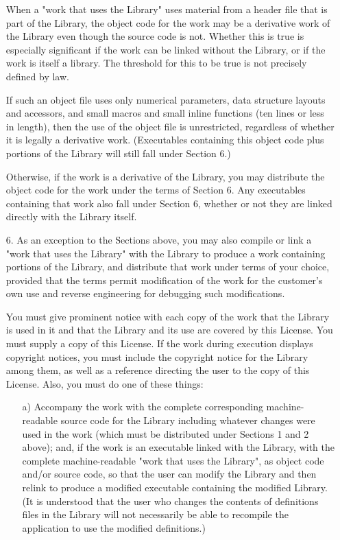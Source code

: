 \begin{itemize}
  When a "work that uses the Library" uses material from a header file
that is part of the Library, the object code for the work may be a
derivative work of the Library even though the source code is not.
Whether this is true is especially significant if the work can be
linked without the Library, or if the work is itself a library.  The
threshold for this to be true is not precisely defined by law.

  If such an object file uses only numerical parameters, data
structure layouts and accessors, and small macros and small inline
functions (ten lines or less in length), then the use of the object
file is unrestricted, regardless of whether it is legally a derivative
work.  (Executables containing this object code plus portions of the
Library will still fall under Section 6.)

  Otherwise, if the work is a derivative of the Library, you may
distribute the object code for the work under the terms of Section 6.
Any executables containing that work also fall under Section 6,
whether or not they are linked directly with the Library itself.

\item[6.] 
   As an exception to the Sections above, you may also compile or
link a "work that uses the Library" with the Library to produce a
work containing portions of the Library, and distribute that work
under terms of your choice, provided that the terms permit
modification of the work for the customer's own use and reverse
engineering for debugging such modifications.

  You must give prominent notice with each copy of the work that the
Library is used in it and that the Library and its use are covered by
this License.  You must supply a copy of this License.  If the work
during execution displays copyright notices, you must include the
copyright notice for the Library among them, as well as a reference
directing the user to the copy of this License.  Also, you must do one
of these things:

    \begin{itemize}
    \item[a)] 
    Accompany the work with the complete corresponding
    machine-readable source code for the Library including whatever
    changes were used in the work (which must be distributed under
    Sections 1 and 2 above); and, if the work is an executable linked
    with the Library, with the complete machine-readable "work that
    uses the Library", as object code and/or source code, so that the
    user can modify the Library and then relink to produce a modified
    executable containing the modified Library.  (It is understood
    that the user who changes the contents of definitions files in the
    Library will not necessarily be able to recompile the application
    to use the modified definitions.)


\end{itemize}
\end{itemize}

